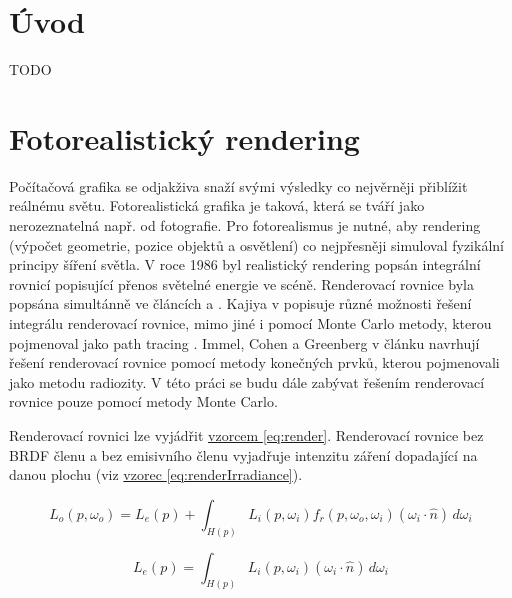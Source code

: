 \documentclass[czech,master,dept460,male,cpp,cpdeclaration]{diploma}
\newcommand{\uvec}[1]{\hat{#1}}
\newcommand{\point}{p}
\newcommand{\brdf}{f_r\left(\point,\omega_{o},\omega_{i}\right)}
\newcommand{\normVec}{\uvec{n}}
\newcommand{\inVec}{\omega_{i}}
\newcommand{\outVec}{\omega_{o}}
\newcommand{\outRadiance}{L_o \left( \point,\outVec \right)}
\newcommand{\inRadiance}{L_i \left( \point,\inVec \right)}
\newcommand{\emitRadiance}{L_e \left( \point \right)}
\newcommand{\inDotNorm}{\left( \inVec \cdot \normVec \right)}
\begin{document}
\MakeTitlePages

\section{Úvod}
TODO
\clearpage
\section{Fotorealistický rendering}
Počítačová grafika se odjakživa snaží svými výsledky co nejvěrněji přiblížit reálnému světu. Fotorealistická grafika je taková, která se tváří jako nerozeznatelná např. od fotografie. Pro fotorealismus je nutné, aby rendering (výpočet geometrie, pozice objektů a osvětlení) co nejpřesněji simuloval fyzikální principy šíření světla. V roce 1986 byl realistický rendering popsán integrální rovnicí popisující přenos světelné energie ve scéně. Renderovací rovnice byla popsána simultánně ve článcích \cite{KajiyaRenderEq} a \cite{ImmelRenderEq}. Kajiya v \cite{KajiyaRenderEq} popisuje různé možnosti řešení integrálu renderovací rovnice, mimo jiné i pomocí Monte Carlo metody, kterou pojmenoval jako path tracing \cite{HainesRayTracingGems2019}. Immel, Cohen a Greenberg v článku \cite{ImmelRenderEq} navrhují řešení renderovací rovnice pomocí metody konečných prvků, kterou pojmenovali jako metodu radiozity. V této práci se budu dále zabývat řešením renderovací rovnice pouze pomocí metody Monte Carlo. \par
Renderovací rovnici lze vyjádřit \hyperref[eq:render]{vzorcem \ref{eq:render}}. Renderovací rovnice bez BRDF členu a bez emisivního členu vyjadřuje intenzitu záření dopadající na danou plochu (viz \hyperref[eq:renderIrradiance]{vzorec \ref{eq:renderIrradiance}})\cite{Dutre2003GICompendum}.

\begin{equation} \label{eq:render}
    \outRadiance = \emitRadiance + \int_{H \left( \point \right)}^{~}\inRadiance \brdf \inDotNorm \,d\inVec
\end{equation}

\begin{equation} \label{eq:renderIrradiance}
    \emitRadiance = \int_{H \left( \point \right)}^{~}\inRadiance \inDotNorm \,d\inVec
\end{equation}
\end{document}
